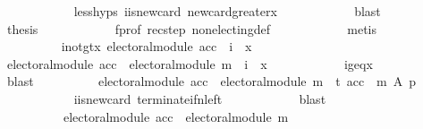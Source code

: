 \begin{isabellebody}
\ \ \ \ \ \ \ \ \ \ \isamarkupfalse%
\ less{\isachardot}{\kern0pt}hyps\ i{\isacharunderscore}{\kern0pt}is{\isacharunderscore}{\kern0pt}new{\isacharunderscore}{\kern0pt}card\ new{\isacharunderscore}{\kern0pt}card{\isacharunderscore}{\kern0pt}greater{\isacharunderscore}{\kern0pt}x\isanewline
\ \ \ \ \ \ \ \ \ \ \isamarkupfalse%
\ blast\isanewline
\ \ \ \ \ \ \ \ \isamarkupfalse%
\ {\isacharquery}{\kern0pt}thesis\isanewline
\ \ \ \ \ \ \ \ \ \ \isamarkupfalse%
\ f{\isacharunderscore}{\kern0pt}prof\ rec{\isacharunderscore}{\kern0pt}step\ non{\isacharunderscore}{\kern0pt}electing{\isacharunderscore}{\kern0pt}def\isanewline
\ \ \ \ \ \ \ \ \ \ \isamarkupfalse%
\ metis\isanewline
\ \ \ \ \ \ \isamarkupfalse%
\isanewline
\ \ \ \ \ \ \ \ \isamarkupfalse%
\ i{\isacharunderscore}{\kern0pt}not{\isacharunderscore}{\kern0pt}gt{\isacharunderscore}{\kern0pt}x{\isacharcolon}{\kern0pt}\ {\isachardoublequoteopen}{\isasymnot}{\isacharparenleft}{\kern0pt}electoral{\isacharunderscore}{\kern0pt}module\ acc\ {\isasymlongrightarrow}\ i\ {\isachargreater}{\kern0pt}\ x{\isacharparenright}{\kern0pt}{\isachardoublequoteclose}\isanewline
\ \ \ \ \ \ \ \ \isamarkupfalse%
\ {\isachardoublequoteopen}electoral{\isacharunderscore}{\kern0pt}module\ acc\ {\isasymand}\ electoral{\isacharunderscore}{\kern0pt}module\ m\ {\isasymlongrightarrow}\ i\ {\isacharequal}{\kern0pt}\ x{\isachardoublequoteclose}\isanewline
\ \ \ \ \ \ \ \ \ \ \isamarkupfalse%
\ i{\isacharunderscore}{\kern0pt}geq{\isacharunderscore}{\kern0pt}x\isanewline
\ \ \ \ \ \ \ \ \ \ \isamarkupfalse%
\ blast\isanewline
\ \ \ \ \ \ \ \ \isamarkupfalse%
\ {\isachardoublequoteopen}electoral{\isacharunderscore}{\kern0pt}module\ acc\ {\isasymand}\ electoral{\isacharunderscore}{\kern0pt}module\ m\ {\isasymlongrightarrow}\ t\ {\isacharparenleft}{\kern0pt}{\isacharparenleft}{\kern0pt}acc\ {\isasymtriangleright}\ m{\isacharparenright}{\kern0pt}\ A\ p{\isacharparenright}{\kern0pt}{\isachardoublequoteclose}\isanewline
\ \ \ \ \ \ \ \ \ \ \isamarkupfalse%
\ i{\isacharunderscore}{\kern0pt}is{\isacharunderscore}{\kern0pt}new{\isacharunderscore}{\kern0pt}card\ terminate{\isacharunderscore}{\kern0pt}if{\isacharunderscore}{\kern0pt}n{\isacharunderscore}{\kern0pt}left\isanewline
\ \ \ \ \ \ \ \ \ \ \isamarkupfalse%
\ blast\isanewline
\ \ \ \ \ \ \ \ \isamarkupfalse%
\isanewline
\ \ \ \ \ \ \ \ \ \ {\isachardoublequoteopen}electoral{\isacharunderscore}{\kern0pt}module\ acc\ {\isasymand}\ electoral{\isacharunderscore}{\kern0pt}module\ m\ {\isasymlongrightarrow}\isanewline

\end{isabellebody}
